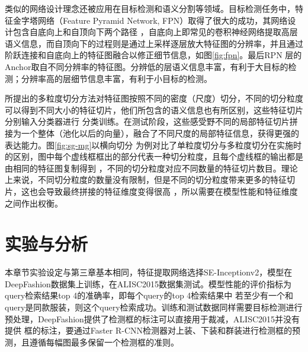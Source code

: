 类似的网络设计理念还被应用在目标检测和语义分割等领域。目标检测任务中，特征金字塔网络（Feature Pyramid Network, FPN）取得了很大的成功\cite{lin2017feature}，其网络设计包含自底向上和自顶向下两个路径
，自底向上即常见的卷积神经网络提取高层语义信息，而自顶向下的过程则是通过上采样逐层放大特征图的分辨率，并且通过阶跃连接和自底向上的特征图融合以修正细节信息，如图\ref{fig:fpn}。最后RPN
层的Anchor取自不同分辨率的特征图。分辨低的层语义信息丰富，有利于大目标的检测；分辨率高的层细节信息丰富，有利于小目标的检测。


所提出的多粒度切分方法对特征图按照不同的密度（尺度）切分，不同的切分粒度可以得到不同大小的特征切片，他们所包含的语义信息也有所区别，这些特征切片分别输入分类器进行
分类训练。在测试阶段，这些感受野不同的局部特征切片拼接为一个整体（池化以后的向量），融合了不同尺度的局部特征信息，获得更强的表达能力。图\ref{fig:sg-mg}以横向切分
为例对比了单粒度切分与多粒度切分在实施时的区别，图中每个虚线框框出的部分代表一种切分粒度，且每个虚线框的输出都是由相同的特征图复制得到
，不同的切分粒度对应不同数量的特征切片数目。理论上来说，不同切分粒度的数量没有限制，但是不同的切分粒度带来更多的特征切片，这也会导致最终拼接的特征维度变得很高
，所以需要在模型性能和特征维度之间作出权衡。

\section{实验与分析}
本章节实验设定与第三章基本相同，特征提取网络选择SE-Inceptionv2，模型在DeepFashion数据集上训练，在ALISC2015数据集测试。模型性能的评价指标为query检索结果top 4的准确率，即每个query的top 4检索结果中
若至少有一个和query是同款服装，则这个query检索成功。训练和测试数据同样需要目标检测进行预处理，DeepFashion提供了检测框的标注可以直接用于裁减，ALISC2015并没有提供
框的标注，要通过Faster R-CNN检测器对上装、下装和群装进行检测框的预测，且遵循每幅图最多保留一个检测框的准则。
